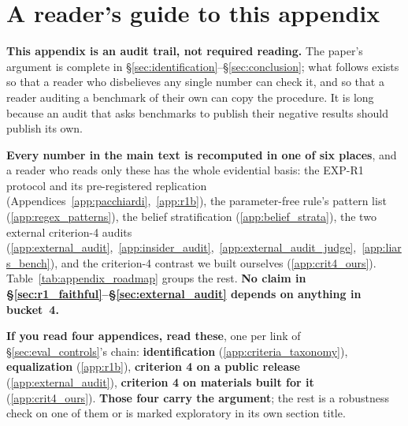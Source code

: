 \section*{A reader's guide to this appendix}
\label{app:reader_guide}

\textbf{This appendix is an audit trail, not required reading.} The paper's argument is complete in
§\ref{sec:identification}--§\ref{sec:conclusion}; what follows exists so that a reader who disbelieves
any single number can check it, and so that a reader auditing a benchmark of their own can copy the
procedure. It is long because an audit that asks benchmarks to publish their negative results should
publish its own.

\textbf{Every number in the main text is recomputed in one of six places}, and a reader who reads
only these has the whole evidential basis: the EXP-R1 protocol and its pre-registered replication
(Appendices~\ref{app:pacchiardi},~\ref{app:r1b}), the parameter-free rule's pattern list
(\ref{app:regex_patterns}), the belief stratification (\ref{app:belief_strata}), the two external
criterion-4 audits (\ref{app:external_audit},~\ref{app:insider_audit},~\ref{app:external_audit_judge},~\ref{app:liars_bench}), and the
criterion-4 contrast we built ourselves (\ref{app:crit4_ours}). Table~\ref{tab:appendix_roadmap}
groups the rest. \textbf{No claim in §\ref{sec:r1_faithful}--§\ref{sec:external_audit} depends on
anything in bucket~4.}

\textbf{If you read four appendices, read these}, one per link of §\ref{sec:eval_controls}'s chain:
\textbf{identification} (\ref{app:criteria_taxonomy}), \textbf{equalization} (\ref{app:r1b}),
\textbf{criterion 4 on a public release} (\ref{app:external_audit}), \textbf{criterion 4 on materials
built for it} (\ref{app:crit4_ours}). \textbf{Those four carry the argument}; the rest is a robustness
check on one of them or is marked exploratory in its own section title.

